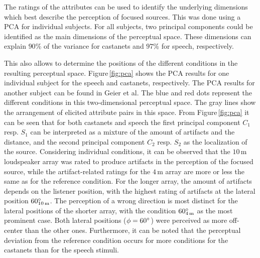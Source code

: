 The ratings of the attributes can be used to identify the underlying dimensions
which best
describe the perception of focused sources. This was done using
a \ac{PCA} for individual subjects.
For all subjects, two principal components could be identified as the main
dimensions of the perceptual space. These dimensions can explain
$90$\% of the variance for castanets and $97$\% for
speech, respectively.

\begin{figure*}[t]
    \centering
    \small
    
    \caption{Principal component analysis for castanets (left) and
    speech (right) for one single subject.
    The blue, red and black points indicate the position of the conditions given in the
    two-dimensional space determined by the two given components for each
    stimulus type. The gray lines show the arrangement of the attribute
    pairs in these two dimensions.
    }
    \label{fig:pca}
\end{figure*}

This also allows to determine the positions of the different conditions in the
resulting perceptual space.  Figure\,\ref{fig:pca} shows the \ac{PCA} results
for one individual subject for the speech and castanets, respectively. The
\ac{PCA} results for another subject can be found in Geier et
al.\autocite{Geier2010a} The blue and red dots represent the different
conditions in this two-dimensional perceptual space. The gray lines show the
arrangement of elicited attribute pairs in this space.  From Figure\,\ref{fig:pca}
it can be seen that for both castanets and speech the first principal component
$C_1$ resp. $S_1$ can be interpreted as a mixture of the amount of artifacts and
the distance, and the second principal component $C_2$ resp. $S_2$ as the
localization of the source.  Considering individual conditions, it can be
observed that the $10$\,m loudspeaker array was rated to produce artifacts in
the perception of the focused source, while the artifact-related ratings for the
$4$\,m array are more or less the same as for the reference condition. For the
longer array, the amount of artifacts depends on the listener position, with the
highest rating of artifacts at the lateral position $60^\circ_{10\,\text{m}}$.
The perception of a wrong direction is most distinct for the
lateral positions of the shorter array, with the condition
$60^\circ_{4\,\text{m}}$ as the most prominent case.  Both lateral positions
($\phi = 60^\circ$) were perceived as more off-center than the other ones.
Furthermore, it can be noted that the perceptual deviation from the reference
condition occurs for more conditions for the castanets than for the speech
stimuli.


